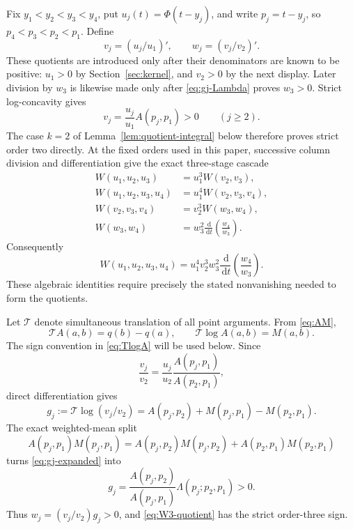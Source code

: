 \documentclass[11pt]{article}
\theoremstyle{remark}
\newcommand{\T}{\mathcal{T}}
\newcommand{\dd}{\,\mathrm{d}}
\newcommand{\secref}[1]{Section~\ref{#1}}
\numberwithin{equation}{section}
\begin{document}
Fix \(y_1<y_2<y_3<y_4\), put \(u_j(t)=\Phi(t-y_j)\), and write
\(p_j=t-y_j\), so \(p_4<p_3<p_2<p_1\). Define
\[
 v_j=(u_j/u_1)',\qquad w_j=(v_j/v_2)'.
\]
These quotients are introduced only after their denominators are known to be
positive: \(u_1>0\) by \secref{sec:kernel}, and \(v_2>0\) by the next
display. Later division by \(w_3\) is likewise made only after
\eqref{eq:gj-Lambda} proves \(w_3>0\).
Strict log-concavity gives
\[
 v_j=\frac{u_j}{u_1}A(p_j,p_1)>0\qquad(j\geq2).
\]
The case \(k=2\) of Lemma~\ref{lem:quotient-integral} below therefore proves
strict order two directly.
At the fixed orders used in this paper, successive column division and
differentiation give the exact three-stage cascade
\begin{align}
 W(u_1,u_2,u_3)&=u_1^3W(v_2,v_3),\label{eq:W3-quotient}\\
 W(u_1,u_2,u_3,u_4)&=u_1^4W(v_2,v_3,v_4),\label{eq:W4-first}\\
 W(v_2,v_3,v_4)&=v_2^3W(w_3,w_4),\label{eq:W4-second}\\
 W(w_3,w_4)&=w_3^2\frac{\dd}{\dd t}
 \left(\frac{w_4}{w_3}\right).\label{eq:W4-third}
\end{align}
Consequently
\begin{equation}\label{eq:W4-quotient}
 W(u_1,u_2,u_3,u_4)=u_1^4v_2^3w_3^2
 \frac{\dd}{\dd t}\left(\frac{w_4}{w_3}\right).
\end{equation}
These algebraic identities require precisely the stated nonvanishing needed
to form the quotients.

Let \(\T\) denote simultaneous translation of all point arguments. From
\eqref{eq:AM},
\begin{equation}\label{eq:TlogA}
 \T A(a,b)=q(b)-q(a),\qquad \T\log A(a,b)=M(a,b).
\end{equation}
The sign convention in \eqref{eq:TlogA} will be used below. Since
\[
 \frac{v_j}{v_2}=\frac{u_j}{u_2}
 \frac{A(p_j,p_1)}{A(p_2,p_1)},
\]
direct differentiation gives
\begin{equation}\label{eq:gj-expanded}
 g_j:=\T\log(v_j/v_2)
 =A(p_j,p_2)+M(p_j,p_1)-M(p_2,p_1).
\end{equation}
The exact weighted-mean split
\[
 A(p_j,p_1)M(p_j,p_1)
 =A(p_j,p_2)M(p_j,p_2)+A(p_2,p_1)M(p_2,p_1)
\]
turns \eqref{eq:gj-expanded} into
\begin{equation}\label{eq:gj-Lambda}
 g_j=\frac{A(p_j,p_2)}{A(p_j,p_1)}
 \Lambda(p_j;p_2,p_1)>0.
\end{equation}
Thus \(w_j=(v_j/v_2)g_j>0\), and
\eqref{eq:W3-quotient} has the strict order-three sign.
\end{document}
